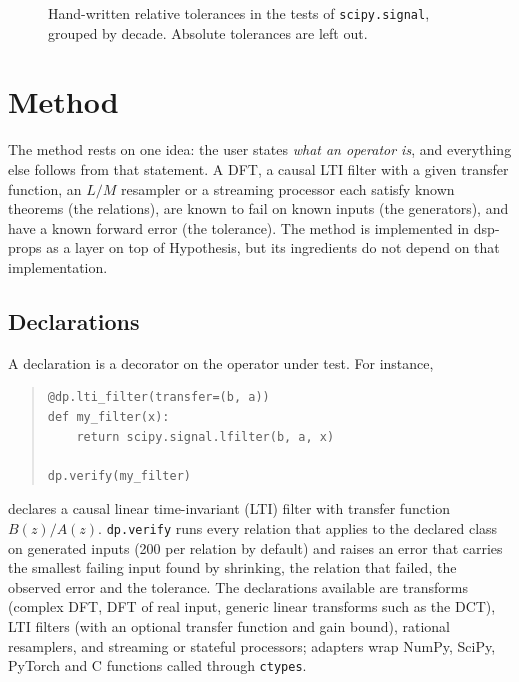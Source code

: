 \documentclass[10pt,conference]{IEEEtran}
\newcommand{\code}[1]{\texttt{#1}}
\begin{document}
\begin{figure}[t]
\centering
{}
\caption{Hand-written relative tolerances in the tests of \code{scipy.signal},
grouped by decade. Absolute tolerances are left out.}
\label{fig:tolhist}
\end{figure}

\section{Method}
\label{sec:method}

The method rests on one idea: the user states \emph{what an operator is}, and
everything else follows from that statement. A DFT, a causal LTI filter with a
given transfer function, an $L/M$ resampler or a streaming processor each
satisfy known theorems (the relations), are known to fail on known inputs (the
generators), and have a known forward error (the tolerance). The method is
implemented in dsp-props as a layer on top of Hypothesis, but its ingredients
do not depend on that implementation.

\subsection{Declarations}
A declaration is a decorator on the operator under test. For instance,
\begin{quote}\footnotesize\begin{verbatim}
@dp.lti_filter(transfer=(b, a))
def my_filter(x):
    return scipy.signal.lfilter(b, a, x)

dp.verify(my_filter)
\end{verbatim}\end{quote}
declares a causal linear time-invariant (LTI) filter with transfer function
$B(z)/A(z)$. \code{dp.verify} runs every relation that applies to the declared
class on generated inputs (200 per relation by default) and raises an error
that carries the smallest failing input found by shrinking, the relation that
failed, the observed error and the tolerance. The declarations available are
transforms (complex DFT, DFT of real input, generic linear transforms such as
the DCT), LTI filters (with an optional transfer function and gain bound),
rational resamplers, and streaming or stateful processors; adapters wrap NumPy,
SciPy, PyTorch and C functions called through \code{ctypes}.
\end{document}
